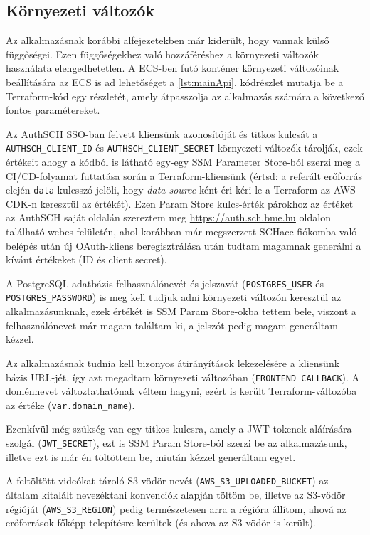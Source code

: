 \subsection{Környezeti változók}

Az alkalmazásnak korábbi alfejezetekben már kiderült, hogy vannak külső függőségei. Ezen függőségekhez való hozzáféréshez a környezeti változók használata elengedhetetlen. A ECS-ben futó konténer környezeti változóinak beállítására az ECS is ad lehetőséget a \ref{lst:mainApi}. kódrészlet mutatja be a Terraform-kód egy részletét, amely átpasszolja az alkalmazás számára a következő fontos paramétereket.

Az AuthSCH SSO-ban felvett kliensünk azonosítóját és titkos kulcsát a \verb|AUTHSCH_CLIENT_ID| és \verb|AUTHSCH_CLIENT_SECRET| környezeti változók tárolják, ezek értékeit ahogy a kódból is látható egy-egy SSM Parameter Store-ból szerzi meg a CI/CD-folyamat futtatása során a Terraform-kliensünk (értsd: a referált erőforrás elején \verb|data| kulcsszó jelöli, hogy \emph{data source}-ként éri kéri le a Terraform az AWS CDK-n keresztül az értékét). Ezen Param Store kulcs-érték párokhoz az értéket az AuthSCH saját oldalán szereztem meg \url{https://auth.sch.bme.hu} oldalon található webes felületén, ahol korábban már megszerzett SCHacc-fiókomba való belépés után új OAuth-kliens beregisztrálása után tudtam magamnak generálni a kívánt értékeket (ID és client secret).

A PostgreSQL-adatbázis felhasználónevét és jelszavát (\verb|POSTGRES_USER| és \verb|POSTGRES_PASSWORD|) is meg kell tudjuk adni környezeti változón keresztül az alkalmazásunknak, ezek értékét is SSM Param Store-okba tettem bele, viszont a felhasználónevet már magam találtam ki, a jelszót pedig magam generáltam kézzel.

Az alkalmazásnak tudnia kell bizonyos átirányítások lekezelésére a kliensünk bázis URL-jét, így azt megadtam környezeti változóban (\verb|FRONTEND_CALLBACK|). A doménnevet változtathatónak véltem hagyni, ezért is került Terraform-változóba az értéke (\verb|var.domain_name|).

Ezenkívül még szükség van egy titkos kulcsra, amely a JWT-tokenek aláírására szolgál (\verb|JWT_SECRET|), ezt is SSM Param Store-ból szerzi be az alkalmazásunk, illetve ezt is már én töltöttem be, miután kézzel generáltam egyet.

A feltöltött videókat tároló S3-vödör nevét (\verb|AWS_S3_UPLOADED_BUCKET|) az általam kitalált nevezéktani konvenciók alapján töltöm be, illetve az S3-vödör régióját (\verb|AWS_S3_REGION|) pedig természetesen arra a régióra állítom, ahová az erőforrások főképp telepítésre kerültek (és ahova az S3-vödör is került). 


